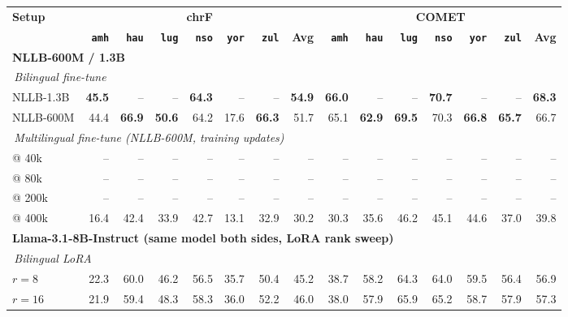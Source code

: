 \begin{table}[t]
\centering
\footnotesize
\setlength{\tabcolsep}{4pt}
\renewcommand{\arraystretch}{1.05}
\begin{tabular}{lrrrrrrrrrrrrrr}
\toprule
\textbf{Setup} & \multicolumn{7}{c}{\textbf{chrF}} & \multicolumn{7}{c}{\textbf{COMET}} \\
\cmidrule(lr){2-8}\cmidrule(lr){9-15}
 & \textbf{\texttt{amh}} & \textbf{\texttt{hau}} & \textbf{\texttt{lug}} & \textbf{\texttt{nso}} & \textbf{\texttt{yor}} & \textbf{\texttt{zul}} & \textbf{Avg} & \textbf{\texttt{amh}} & \textbf{\texttt{hau}} & \textbf{\texttt{lug}} & \textbf{\texttt{nso}} & \textbf{\texttt{yor}} & \textbf{\texttt{zul}} & \textbf{Avg} \\
\midrule
\multicolumn{15}{l}{\textbf{NLLB-600M / 1.3B}} \\
\cmidrule(l){1-15}
\multicolumn{15}{l}{\textit{\,Bilingual fine-tune}} \\
\quad NLLB-1.3B & \textbf{45.5} & -- & -- & \textbf{64.3} & -- & -- & \textbf{54.9} & \textbf{66.0} & -- & -- & \textbf{70.7} & -- & -- & \textbf{68.3} \\
\quad NLLB-600M & 44.4 & \textbf{66.9} & \textbf{50.6} & 64.2 & 17.6 & \textbf{66.3} & 51.7 & 65.1 & \textbf{62.9} & \textbf{69.5} & 70.3 & \textbf{66.8} & \textbf{65.7} & 66.7 \\
\cmidrule(l){1-15}
\multicolumn{15}{l}{\textit{\,Multilingual fine-tune (NLLB-600M, training updates)}} \\
\quad @ 40k & -- & -- & -- & -- & -- & -- & -- & -- & -- & -- & -- & -- & -- & -- \\
\quad @ 80k & -- & -- & -- & -- & -- & -- & -- & -- & -- & -- & -- & -- & -- & -- \\
\quad @ 200k & -- & -- & -- & -- & -- & -- & -- & -- & -- & -- & -- & -- & -- & -- \\
\quad @ 400k & 16.4 & 42.4 & 33.9 & 42.7 & 13.1 & 32.9 & 30.2 & 30.3 & 35.6 & 46.2 & 45.1 & 44.6 & 37.0 & 39.8 \\
\midrule
\multicolumn{15}{l}{\textbf{Llama-3.1-8B-Instruct (same model both sides, LoRA rank sweep)}} \\
\cmidrule(l){1-15}
\multicolumn{15}{l}{\textit{\,Bilingual LoRA}} \\
\quad $r{=}8$ & 22.3 & 60.0 & 46.2 & 56.5 & 35.7 & 50.4 & 45.2 & 38.7 & 58.2 & 64.3 & 64.0 & 59.5 & 56.4 & 56.9 \\
\quad $r{=}16$ & 21.9 & 59.4 & 48.3 & 58.3 & 36.0 & 52.2 & 46.0 & 38.0 & 57.9 & 65.9 & 65.2 & 58.7 & 57.9 & 57.3 \\

\end{tabular}
\end{table}
